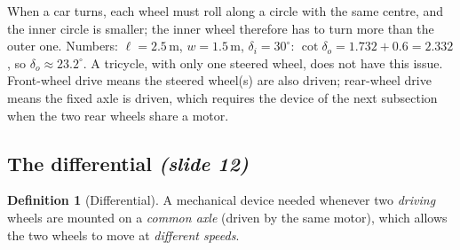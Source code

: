 \documentclass[11pt,a4paper]{article}
\theoremstyle{definition}
\newtheorem{definition}{Definition}[section]
\theoremstyle{plain}
\newtheorem{proposition}[definition]{Proposition}
\theoremstyle{remark}
\begin{document}

\begin{intuition}
When a car turns, each wheel must roll along a circle with the same centre, and the inner circle is smaller; the inner wheel therefore has to turn more than the outer one. Numbers: $\ell=2.5$\,m, $w=1.5$\,m, $\delta_i=30^\circ$: $\cot\delta_o=1.732+0.6=2.332$, so $\delta_o\approx23.2^\circ$. A tricycle, with only one steered wheel, does not have this issue. Front-wheel drive means the steered wheel(s) are also driven; rear-wheel drive means the fixed axle is driven, which requires the device of the next subsection when the two rear wheels share a motor.
\end{intuition}

\subsection{The differential \emph{(slide 12)}}

\begin{definition}[Differential]
A mechanical device needed whenever two \emph{driving} wheels are mounted on a \emph{common axle} (driven by the same motor), which allows the two wheels to move at \emph{different speeds}.
\end{definition}
\end{document}
